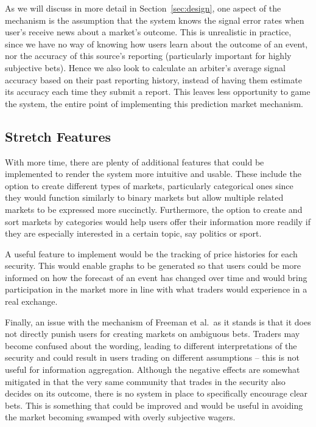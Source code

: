 As we will discuss in more detail in Section~\ref{sec:design}, one aspect of
the mechanism is the assumption that the system knows the signal error rates
when user's receive news about a market's outcome. This is unrealistic in
practice, since we have no way of knowing how users learn about the outcome of
an event, nor the accuracy of this source's reporting (particularly important
for highly subjective bets). Hence we also look to calculate an arbiter's
average signal accuracy based on their past reporting history, instead of
having them estimate its accuracy each time they submit a report. This leaves
less opportunity to game the system, the entire point of implementing this
prediction market mechanism.

\subsection{Stretch Features}

With more time, there are plenty of additional features that could be
implemented to render the system more intuitive and usable. These include the
option to create different types of markets, particularly categorical ones
since they would function similarly to binary markets but allow multiple
related markets to be expressed more succinctly. Furthermore, the option to
create and sort markets by categories would help users offer their information
more readily if they are especially interested in a certain topic, say politics
or sport.

A useful feature to implement would be the tracking of price histories for each
security. This would enable graphs to be generated so that users could be more
informed on how the forecast of an event has changed over time and would bring
participation in the market more in line with what traders would experience in
a real exchange.

Finally, an issue with the mechanism of Freeman et al.\ as it stands is that it
does not directly punish users for creating markets on ambiguous bets. Traders
may become confused about the wording, leading to different interpretations of
the security and could result in users trading on different assumptions -- this
is not useful for information aggregation. Although the negative effects are
somewhat mitigated in that the very same community that trades in the security
also decides on its outcome, there is no system in place to specifically
encourage clear bets. This is something that could be improved and would be
useful in avoiding the market becoming swamped with overly subjective wagers.

